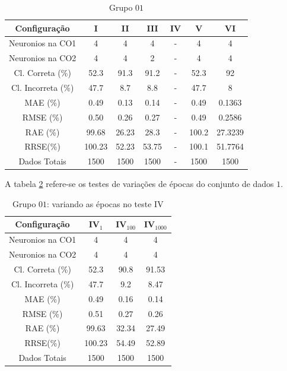\documentclass[journal, a4paper]{IEEEtran}
\begin{document}
\begin{table}[ht]
	\begin{center}
				\caption{Grupo $01$}
				\label{grupo01}
				\begin{tabular}{|c|c|c|c|c|c|c|}\hline	
					\textbf{Configuração} &\textbf{I}&\textbf{II}&\textbf{III}&\textbf{IV}&\textbf{V}&\textbf{VI} \\ \hline 
					{Neuronios na CO1} & 4 & 4 & 4 & - & 4 & 4 \\ \hline
					{Neuronios na CO2} & 4 & 4 & 2 & - & 4 & 4 \\ \hline
					{Cl. Correta (\%)} & 52.3 & 91.3 & 91.2  & - & 52.3 &  92  \\ \hline
					{Cl. Incorreta (\%)} & 47.7 & 8.7 & 8.8 & - & 47.7 & 8 \\ \hline
					{MAE (\%)} & 0.49 &  0.13 & 0.14 & - & 0.49 & 0.1363 \\ \hline
					{RMSE (\%)} & 0.50 & 0.26 & 0.27 & - & 0.49 & 0.2586 \\ \hline
					{RAE (\%)} & 99.68 & 26.23 & 28.3 & - & 100.2 & 27.3239 \\ \hline
					{RRSE(\%)} & 100.23 & 52.23 & 53.75 & - & 100.1 & 51.7764 \\ \hline
					{Dados Totais} & 1500 & 1500  & 1500 & - & 1500 & 1500 \\ \hline
				\end{tabular}  
	\end{center}
\end{table}

A tabela \ref{grupo01IV} refere-se os testes de variações de épocas do conjunto de dados $1$.

\begin{table}[ht]
	\begin{center}
		\caption{Grupo $01$: variando as épocas no teste IV}
		\label{grupo01IV}
		\begin{tabular}{|c|c|c|c|}\hline	
			\textbf{Configuração} &$\textbf{IV}_{1}$&$\textbf{IV}_{100}$&$\textbf{IV}_{1000}$ \\ \hline 
			{Neuronios na CO1}   & 4      & 4     & 4      \\ \hline
			{Neuronios na CO2}   & 4      & 4     & 4      \\ \hline
			{Cl. Correta (\%)}   & 52.3   & 90.8  & 91.53  \\ \hline
			{Cl. Incorreta (\%)} & 47.7   & 9.2   & 8.47   \\ \hline
			{MAE (\%)}           & 0.49   & 0.16  & 0.14   \\ \hline
			{RMSE (\%)}          & 0.51   & 0.27  & 0.26   \\ \hline
			{RAE (\%)}           & 99.63  & 32.34 & 27.49   \\ \hline
			{RRSE(\%)}           & 100.23 & 54.49 & 52.89  \\ \hline
			{Dados Totais}       & 1500   & 1500  & 1500   \\ \hline
		\end{tabular}  
	\end{center}
\end{table}
\end{document}
